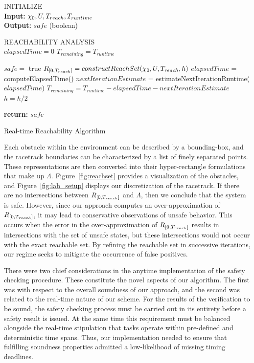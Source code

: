 \documentclass[manuscript,screen,review]{acmart}
\newcommand{\figref}[1]{Figure~\ref{#1}}
\begin{document}
\begin{algorithm}[htbp]%
\DontPrintSemicolon 
INITIALIZE{
\\
\textbf{Input:} $\chi_0,\mathnormal{U},T_{reach}, T_{runtime}$ \\
\textbf{Output:} $safe$ (boolean)
}

\vspace{2mm}

REACHABILITY ANALYSIS\\
$elapsedTime = 0$\;
$T_{remaining} = T_{runtime}$\;
 {
    $safe = $ true\;
    $\mathnormal{R}_{[0,T_{reach}]}= constructReachSet(\chi_0,\mathnormal{U},T_{reach},h)$\;
    $elapsedTime$ = computeElapsedTime()\;
    $nextIterationEstimate$ = estimateNextIterationRuntime($elapsedTime$)\;
    $T_{remaining} = T_{runtime} -elapsedTime - nextIterationEstimate$\;
    $h = h /2$\;
    
    
    
}
\textbf{return:} $safe$
\caption{Real-time Reachability Algorithm}
\label{alg:algo_rtreach}
\end{algorithm}%

Each obstacle within the environment can be described by a bounding-box, and the racetrack boundaries can be characterized by a list of finely separated points. These representations are then converted into their hyper-rectangle formulations that make up $\Lambda$. \figref{fig:reachset} provides a visualization of the obstacles, and \figref{fig:lab_setup} displays our discretization of the racetrack. If there are no intersections between $\mathnormal{R}_{[0,T_{reach}]}$ and $\Lambda$, then we conclude that the system is safe. However, since our approach computes an  over-approximation of $\mathnormal{R}_{[0,T_{reach}]}$, it may lead to conservative observations of unsafe behavior. This occurs when the error in the over-approximation of $\mathnormal{R}_{[0,T_{reach}]}$ results in intersections with the set of unsafe states, but these intersections would not occur with the exact reachable set. By refining the reachable set in successive iterations, our regime seeks to mitigate the occurrence of false positives.  


There were two chief considerations in the anytime implementation of the safety checking procedure. These constitute the novel aspects of our algorithm. The first was with respect to the overall soundness of our approach, and the second was related to the real-time nature of our scheme. For the results of the verification to be sound, the safety checking process must be carried out in its entirety before a safety result is issued. At the same time this requirement must be balanced alongside the real-time stipulation that tasks operate within pre-defined and deterministic time spans. Thus, our implementation needed to ensure that fulfilling soundness properties admitted a low-likelihood of missing timing deadlines.
\end{document}
